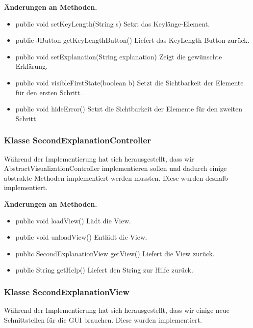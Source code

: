 \documentclass{article}
\begin{document}
    \textbf{Änderungen an Methoden.}
      \begin{itemize}
		\item public void setKeyLength(String s)\newline
              Setzt das Keylänge-Element.
		\item public JButton getKeyLengthButton()\newline
              Liefert das KeyLength-Button zurück.
		\item public void setExplanation(String explanation)\newline
              Zeigt die gewünschte Erklärung.
		\item public void visibleFirstState(boolean b)\newline
              Setzt die Sichtbarkeit der Elemente für den ersten Schritt.
		\item public void hideError()\newline
              Setzt die Sichtbarkeit der Elemente für den zweiten Schritt.	
	  \end{itemize}
	  
    \subsubsection{Klasse SecondExplanationController}
	Während der Implementierung hat sich herausgestellt, dass wir AbstractVisualizationController implementieren sollen und dadurch 
	einige abstrakte Methoden implementiert werden mussten. Diese wurden deshalb implementiert.\newline
           
    \textbf{Änderungen an Methoden.}
      \begin{itemize}
		\item public void loadView()\newline
              Lädt die View.
        \item public void unloadView()\newline
              Entlädt die View.
        \item public SecondExplanationView getView()\newline
              Liefert die View zurück.
        \item public String getHelp()\newline
              Liefert den String zur Hilfe zurück.
      \end{itemize}
	  
    \subsubsection{Klasse SecondExplanationView}
	Während der Implementierung hat sich herausgestellt, dass wir einige neue Schnittstellen für die GUI brauchen. Diese wurden implementiert.\newline
           
\end{document}
